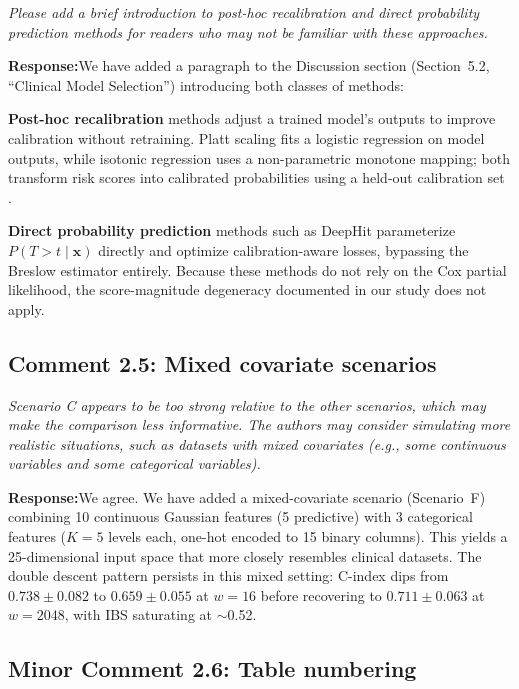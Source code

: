 \documentclass[12pt,a4paper]{article}
\newcommand{\comment}[1]{%
  \begin{reviewerbox}
    \textit{#1}
  \end{reviewerbox}
}
\newcommand{\response}{\noindent\textbf{Response:}\quad}
\newcommand{\bx}{\bm{x}}
\begin{document}
\comment{Please add a brief introduction to post-hoc recalibration and direct probability prediction methods for readers who may not be familiar with these approaches.}

\response We have added a paragraph to the Discussion section (Section~5.2,
``Clinical Model Selection'') introducing both classes of methods:

\textbf{Post-hoc recalibration} methods adjust a trained model's outputs to
improve calibration without retraining. Platt scaling fits a logistic
regression on model outputs, while isotonic regression uses a non-parametric
monotone mapping; both transform risk scores into calibrated probabilities
using a held-out calibration set \citep{crowson2016assessing,
vancalster2019calibration}.

\textbf{Direct probability prediction} methods such as DeepHit
\citep{lee2018deephit} parameterize $P(T > t \mid \bx)$ directly and
optimize calibration-aware losses, bypassing the Breslow estimator entirely.
Because these methods do not rely on the Cox partial likelihood, the
score-magnitude degeneracy documented in our study does not apply.


\bigskip

\subsection*{Comment 2.5: Mixed covariate scenarios}

\comment{Scenario C appears to be too strong relative to the other scenarios, which may make the comparison less informative. The authors may consider simulating more realistic situations, such as datasets with mixed covariates (e.g., some continuous variables and some categorical variables).}

\response We agree. We have added a mixed-covariate scenario (Scenario~F)
combining 10 continuous Gaussian features (5 predictive) with 3 categorical
features ($K = 5$ levels each, one-hot encoded to 15 binary columns). This
yields a 25-dimensional input space that more closely resembles clinical
datasets. The double descent pattern persists in this mixed setting: C-index
dips from $0.738 \pm 0.082$ to $0.659 \pm 0.055$ at $w = 16$ before
recovering to $0.711 \pm 0.063$ at $w = 2048$, with IBS saturating at
$\sim$0.52.


\bigskip

\subsection*{Minor Comment 2.6: Table numbering}
\end{document}
